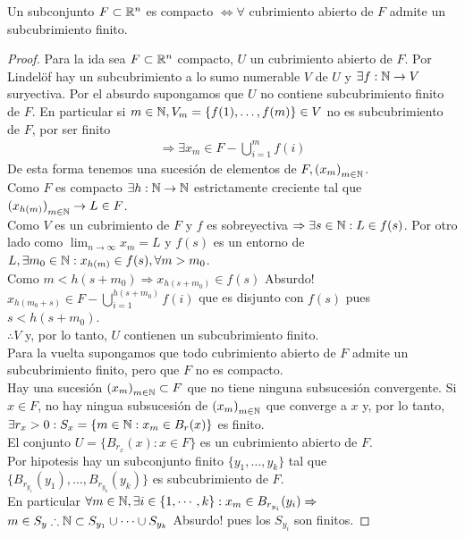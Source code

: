 \begin{corollary}
  Un subconjunto \(F \subset \mathbb{R}^n\) es compacto \(\iff \forall \) cubrimiento abierto de \(F\) admite un subcubrimiento finito.
  \begin{proof}
    Para la ida sea \(F \subset \mathbb{R}^n\) compacto, \(U\) un cubrimiento abierto de \(F\). Por Lindelöf hay un subcubrimiento a lo sumo numerable \(V\) de \(U\) y \(\exists f: \mathbb{N} \to V\) suryectiva.
    Por el absurdo supongamos que \(U\) no contiene subcubrimiento finito de \(F\).
    En particular si \(m \in \mathbb{N}, V_m = \{ f(1), \ldots, f(m) \} \in V\) no es subcubrimiento de \(F\), por ser finito
    \begin{align*}
      \Rightarrow \exists x_m \in F - \bigcup_{i = 1}^m f(i)
    \end{align*}
    De esta forma tenemos una sucesión de elementos de \(F, {(x_m)}_{m \in \mathbb{N}} \). \\
    Como \(F\) es compacto \(\exists h: \mathbb{N} \to \mathbb{N} \) estrictamente creciente tal que \({(x_{h(m)})}_{m \in \mathbb{N}} \to L \in F\). \\
    Como \(V\) es un cubrimiento de \(F\) y \(f\) es sobreyectiva \(\Rightarrow \exists s \in \mathbb{N} : L \in f(s)\).
    Por otro lado como \(\lim_{n \to \infty} x_m = L\) y \(f(s)\) es un entorno de \(L, \exists m_0 \in \mathbb{N} : x_{h(m)} \in f(s), \forall m > m_0\). \\
    Como \(m < h(s + m_0) \Rightarrow x_{h(s+m_0)} \in f(s)\) Absurdo! \\
    \(x_{h(m_0 + s)} \in F - \bigcup_{i=1}^{h(s+m_0)} f(i)\) que es disjunto con \(f(s)\) pues \(s < h(s + m_0)\). \\
    \(\therefore V\) y, por lo tanto, \(U\) contienen un subcubrimiento finito. \\

    Para la vuelta supongamos que todo cubrimiento abierto de \(F\) admite un
    subcubrimiento finito, pero que \(F\) no es compacto. \\ Hay una sucesión
    \({(x_m)}_{m \in \mathbb{N}} \subset F\) que no tiene ninguna subsucesión convergente. Si
    \(x \in F\), no hay ningua subsucesión de \({(x_m)}_{m \in \mathbb{N}} \) que converge a \(x\)
    y, por lo tanto, \(\exists r_x > 0 : S_x = \{ m \in \mathbb{N} : x_m \in B_r(x) \} \) es
    finito. \\ El conjunto \(U = \{ B_{r_x}(x) : x \in F \} \) es un cubrimiento
    abierto de \(F\). \\ Por hipotesis hay un subconjunto finito \( \{ y_1, \ldots,
    y_k\} \) tal que \( \{ B_{r_{y_1}}(y_1), \ldots, B_{r_{y_k}}(y_k) \} \) es
    subcubrimiento de \(F\). \\ En particular \(\forall m \in \mathbb{N}, \exists i \in \{ 1,
    \cdots, k \} : x_m \in B_{r_{y_i}}(y_i) \Rightarrow \) \\ \(m \in S_y \therefore
    \mathbb{N} \subset S_{y_1} \cup \cdots \cup S_{y_k} \) Absurdo! pues los \(S_{y_i} \) son
    finitos.
  \end{proof}
\end{corollary}


